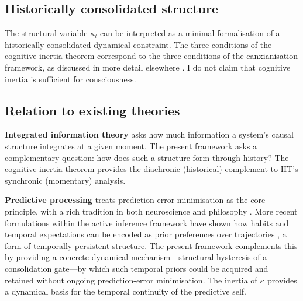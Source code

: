 \subsection{Historically consolidated structure}

The structural variable $\kappa_t$ can be interpreted as a minimal formalisation of a historically consolidated dynamical constraint. The three conditions of the cognitive inertia theorem correspond to the three conditions of the canxianisation framework, as discussed in more detail elsewhere \cite{cai2024law}. I do not claim that cognitive inertia is sufficient for consciousness.

\subsection{Relation to existing theories}

\textbf{Integrated information theory} \cite{tononi2016integrated} asks how much information a system's causal structure integrates at a given moment. The present framework asks a complementary question: how does such a structure form through history? The cognitive inertia theorem provides the diachronic (historical) complement to IIT's synchronic (momentary) analysis.

\textbf{Predictive processing} \cite{rao1999predictive, friston2010free, clark2013surfing, hohwy2013predictive} treats prediction-error minimisation as the core principle, with a rich tradition in both neuroscience \cite{rao1999predictive} and philosophy \cite{hohwy2013predictive}. More recent formulations within the active inference framework have shown how habits and temporal expectations can be encoded as prior preferences over trajectories \cite{parr2017active}, a form of temporally persistent structure. The present framework complements this by providing a concrete dynamical mechanism---structural hysteresis of a consolidation gate---by which such temporal priors could be acquired and retained without ongoing prediction-error minimisation. The inertia of $\kappa$ provides a dynamical basis for the temporal continuity of the predictive self.

